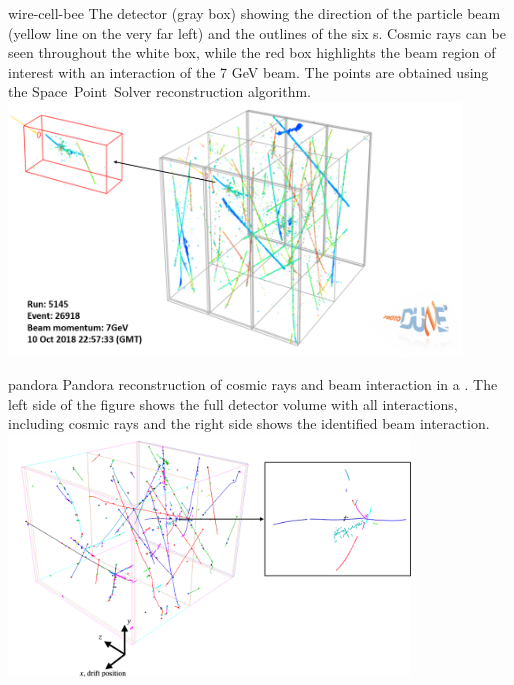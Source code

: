 \documentclass[../main-v1.tex]{subfiles}
\begin{document}
\begin{dunefigure}
{wire-cell-bee} %
{The  detector (gray box) showing 
the direction of the particle beam (yellow line on the very far left) and the outlines of the six s. Cosmic rays
can be seen throughout the white box, while the red box highlights the beam region of interest with an interaction of the 7 GeV beam. 
The \threed points are obtained using the Space~Point~Solver reconstruction algorithm.}
\includegraphics[width=0.9\textwidth]{graphics/IntroFigures/Fig_06_bee_event.png}
\end{dunefigure}


\begin{dunefigure}
{pandora}
{Pandora  reconstruction of cosmic rays and beam interaction in a  . The left side of the figure shows the full detector volume with all interactions, including cosmic rays and the right side shows the identified beam interaction.}
\includegraphics[width=0.8\textwidth]{graphics/IntroFigures/Fig_07_pandora.png}
\end{dunefigure}
\end{document}
